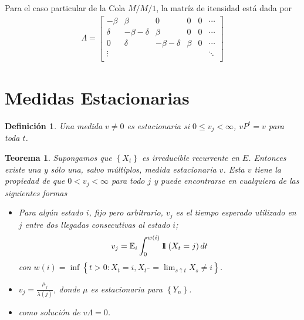 \documentclass{article}
\newtheorem{Def}{Definición}[section]
\newtheorem{Teo}{Teorema}[section]
\newcommand{\esp}{\mathbb{E}}
\newcommand{\indora}{\mbox{$1$\hspace{-0.8ex}$1$}}
\numberwithin{equation}{section}
\begin{document}
Para el caso particular de la Cola $M/M/1$, la matr\'iz de itensidad est\'a dada por
\begin{eqnarray*}
\Lambda=\left[\begin{array}{cccccc}
-\beta & \beta & 0 &0 &0& \cdots\\
\delta & -\beta-\delta & \beta & 0 & 0 &\cdots\\
0 & \delta & -\beta-\delta & \beta & 0 &\cdots\\
\vdots & & & & & \ddots\\
\end{array}\right]
\end{eqnarray*}


\section{Medidas Estacionarias}
%


\begin{Def}
Una medida $v\neq0$ es estacionaria si $0\leq v_{j}<\infty$, $vP^{t}=v$ para toda $t$.
\end{Def}

\begin{Teo}\label{Teo.4.2}
Supongamos que $\left\{X_{t}\right\}$ es irreducible recurrente en $E$. Entonces existe una y s\'olo una, salvo m\'ultiplos, medida estacionaria $v$. Esta $v$ tiene la propiedad de que $0<v_{j}<\infty$ para todo $j$ y puede encontrarse en cualquiera de las siguientes formas

\begin{itemize}
\item[i)] Para alg\'un estado $i$, fijo pero arbitrario, $v_{j}$ es el tiempo esperado utilizado en $j$ entre dos llegadas consecutivas al estado $i$;
\begin{equation}\label{Eq.4.2}
v_{j}=\esp_{i}\int_{0}^{w\left(i\right)}\indora\left(X_{t}=j\right)dt
\end{equation}
con $w\left(i\right)=\inf\left\{t>0:X_{t}=i,X_{t^{-}}=\lim_{s\uparrow t}X_{s}\neq i\right\}$. 
\item[ii)]
$v_{j}=\frac{\mu_{j}}{\lambda\left(j\right)}$, donde $\mu$ es estacionaria para $\left\{Y_{n}\right\}$. 
\item[iii)] como soluci\'on de $v\Lambda=0$.
\end{itemize}
\end{Teo}
\end{document}
